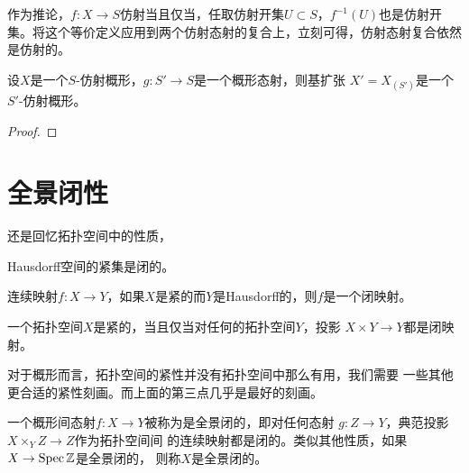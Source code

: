 作为推论，$f:X\to S$仿射当且仅当，任取仿射开集$U\subset S$，$f^{-1}(U)$也是仿射开集。将这个等价定义应用到两个仿射态射的复合上，立刻可得，仿射态射复合依然是仿射的。

\begin{pro}
设$X$是一个$S$-仿射概形，$g:S'\to S$是一个概形态射，则基扩张
$X'=X_{(S')}$是一个$S'$-仿射概形。
\end{pro}

\begin{proof}
\notprove
\end{proof}


\section{全景闭性}

还是回忆拓扑空间中的性质，
\begin{compactenum}
\item Hausdorff空间的紧集是闭的。
\item 连续映射$f:X\to Y$，如果$X$是紧的而$Y$是Hausdorff的，则$f$是一个闭映射。
\item 一个拓扑空间$X$是紧的，当且仅当对任何的拓扑空间$Y$，投影
	$X\times Y\to Y$都是闭映射。
\end{compactenum}
对于概形而言，拓扑空间的紧性并没有拓扑空间中那么有用，我们需要
一些其他更合适的紧性刻画。而上面的第三点几乎是最好的刻画。

\begin{para}[全景闭性]
	一个概形间态射$f:X\to Y$被称为是全景闭的，即对任何态射
	$g:Z\to Y$，典范投影$X\times_Y Z\to Z$作为拓扑空间间
	的连续映射都是闭的。类似其他性质，如果$X\to \operatorname{Spec} \mathbb{Z}$是全景闭的，
	则称$X$是全景闭的。
\end{para}
